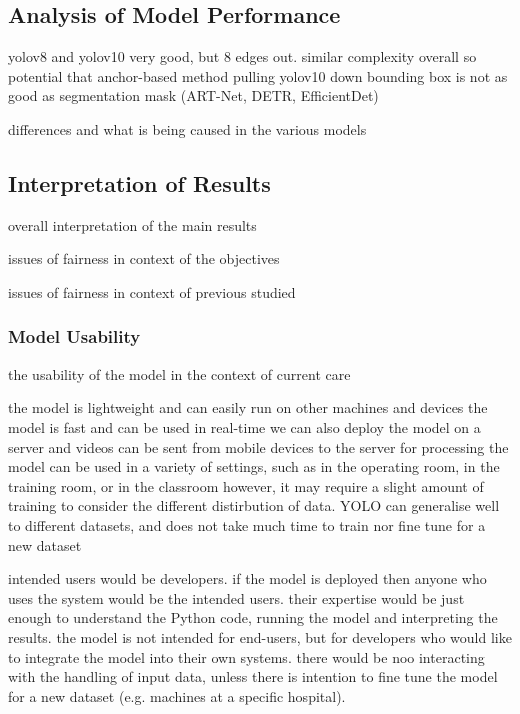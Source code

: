 \subsection{Analysis of Model Performance}

yolov8 and yolov10 very good, but 8 edges out. similar complexity overall so potential that anchor-based method pulling yolov10 down
bounding box is not as good as segmentation mask (ART-Net, DETR, EfficientDet)

differences and what is being caused in the various models

\subsection{Interpretation of Results}

overall interpretation of the main results

issues of fairness in context of the objectives

issues of fairness in context of previous studied

\subsubsection{Model Usability}

the usability of the model in the context of current care

the model is lightweight and can easily run on other machines and devices
the model is fast and can be used in real-time
we can also deploy the model on a server and videos can be sent from mobile devices to the server for processing
the model can be used in a variety of settings, such as in the operating room, in the training room, or in the classroom
however, it may require a slight amount of training to consider the different distirbution of data. YOLO can generalise well to different datasets, and does not take much time to train nor fine tune for a new dataset

intended users would be developers. if the model is deployed then anyone who uses the system would be the intended users. their expertise would be just enough to understand the Python code, running the model and interpreting the results. the model is not intended for end-users, but for developers who would like to integrate the model into their own systems. there would be noo interacting with the handling of input data, unless there is intention to fine tune the model for a new dataset (e.g. machines at a specific hospital).

